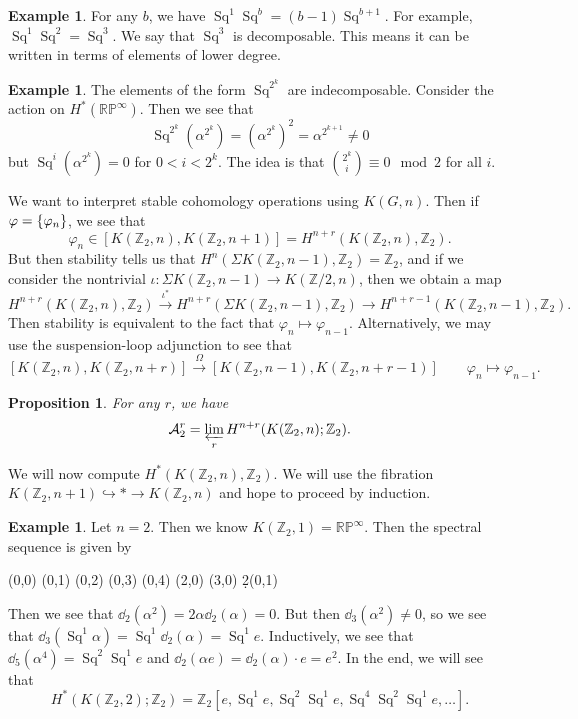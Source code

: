 \documentclass[leqno, openany]{memoir}
\newtheorem{prop}[thm]{Proposition}
\theoremstyle{definition}
\newtheorem{exm}[thm]{Example}
\theoremstyle{remark}
\theoremstyle{plain}
\theoremstyle{definition}
\theoremstyle{remark}
\newcommand{\R}{\mathbb{R}}
\newcommand{\Z}{\mathbb{Z}}
\renewcommand{\P}{\mathbb{P}}
\newcommand{\mc}[1]{\mathcal{#1}}
\DeclareMathOperator{\Sq}{Sq}
\begin{document}
\begin{exm} For any $b$, we have $\Sq^1 \Sq^b = (b-1) \Sq^{b+1}$. For example,
$\Sq^1 \Sq^2 = \Sq^3$. We say that $\Sq^3$ is decomposable. This means it can
be written in terms of elements of lower degree.  \end{exm}

\begin{exm} The elements of the form $\Sq^{2^k}$ are indecomposable. Consider
    the action on $H^*(\R\P^{\infty})$. Then we see that \[
    \Sq^{2^k}(\alpha^{2^k}) = {(\alpha^{2^k})}^2 = \alpha^{2^{k+1}} \neq 0 \]
    but $\Sq^i (\alpha^{2^k})=  0$ for $0 < i < 2^k$. The idea is that
    $\binom{2^k}{i} \equiv 0 \mod 2$ for all $i$.  \end{exm}

We want to interpret stable cohomology operations using $K(G, n)$. Then if
$\varphi = \qty{\varphi_n}$, we see that \[ \varphi_n \in [K(\Z_2, n),K(\Z_2,
n+1)] = H^{n+r}(K(\Z_2, n), \Z_2). \] But then stability tells us that
$H^n(\Sigma K(\Z_2, n-1), \Z_2) = \Z_2$, and if we consider the nontrivial
$\iota \colon \Sigma K(\Z_2, n-1) \to K(\Z/2, n)$, then we obtain a map \[
H^{n+r}(K(\Z_2, n), \Z_2) \xrightarrow{\iota^*} H^{n+r}(\Sigma K(\Z_2, n-1),
\Z_2) \to H^{n+r-1}(K(\Z_2, n-1), \Z_2). \] Then stability is equivalent to the
fact that $\varphi_n \mapsto \varphi_{n-1}$. Alternatively, we may use the
suspension-loop adjunction to see that \[ [K(\Z_2, n), K(\Z_2, n+r)]
\xrightarrow{\Omega} [K(\Z_2, n-1), K(\Z_2, n+r-1)] \qquad \varphi_n \mapsto
\varphi_{n-1}. \]

\begin{prop} For any $r$, we have \[ \mc{A}_2^r = \varprojlim_{r}
H^{n+r}(K(\Z_2, n); \Z_2). \] \end{prop}

We will now compute $H^*(K(\Z_2, n), \Z_2)$. We will use the fibration $K(\Z_2,
n+ 1) \hookrightarrow * \to K(\Z_2, n)$ and hope to proceed by induction.

\begin{exm} Let $n = 2$. Then we know $K(\Z_2, 1) = \R \P^{\infty}$. Then the
    spectral sequence is given by \begin{center}
        \begin{sseqdata}[classes={draw=none}, name=kz22, cohomological Serre
            grading] \class["1"](0,0) \class["\alpha"](0,1)
        \class["\alpha^2"](0,2) \class["\alpha^3"](0,3) \class["\alpha^2"](0,4)
    \class["e"](2,0) \class["\Sq^1 e"](3,0) \d2(0,1) \end{sseqdata}
\printpage[name=kz22, page=2, grid=chess] \end{center} Then we see that
$\dd_2(\alpha^2) = 2 \alpha \dd_2(\alpha) = 0$. But then $\dd_3(\alpha^2) \neq
0$, so we see that $\dd_3(\Sq^1 \alpha) = \Sq^1 \dd_2(\alpha) = \Sq^1 e$.
Inductively, we see that $\dd_5(\alpha^4) = \Sq^2 \Sq^1 e$ and $\dd_2(\alpha e)
= \dd_2 (\alpha) \cdot e = e^2$. In the end, we will see that \[ H^*(K(\Z_2,
2); \Z_2) = \Z_2 [ e, \Sq^1 e, \Sq^2 \Sq^1 e, \Sq^4 \Sq^2 \Sq^1 e, \ldots ]. \]
\end{exm}
\end{document}
